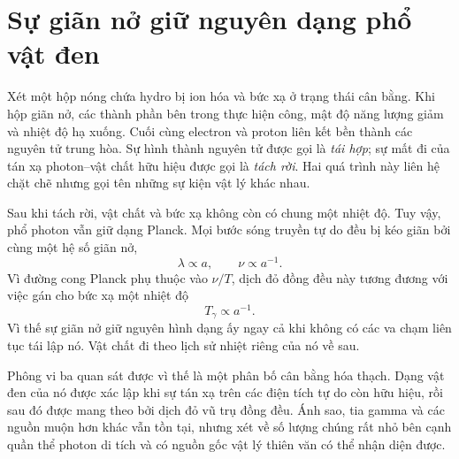 \begin{classroomqa}
\end{classroomqa}

\section{Sự giãn nở giữ nguyên dạng phổ vật đen}

Xét một hộp nóng chứa hydro bị ion hóa và bức xạ ở trạng thái cân bằng. Khi hộp giãn nở, các thành phần bên trong thực hiện công, mật độ năng lượng giảm và nhiệt độ hạ xuống. Cuối cùng electron và proton liên kết bền thành các nguyên tử trung hòa. Sự hình thành nguyên tử được gọi là \emph{tái hợp}; sự mất đi của tán xạ photon--vật chất hữu hiệu được gọi là \emph{tách rời}. Hai quá trình này liên hệ chặt chẽ nhưng gọi tên những sự kiện vật lý khác nhau.

Sau khi tách rời, vật chất và bức xạ không còn có chung một nhiệt độ. Tuy vậy, phổ photon vẫn giữ dạng Planck. Mọi bước sóng truyền tự do đều bị kéo giãn bởi cùng một hệ số giãn nở,
\begin{equation}
\lambda\propto a,
\qquad
\nu\propto a^{-1}.
\end{equation}
Vì đường cong Planck phụ thuộc vào \(\nu/T\), dịch đỏ đồng đều này tương đương với việc gán cho bức xạ một nhiệt độ
\begin{equation}
\boxed{T_\gamma\propto a^{-1}.}
\label{eq:c07-temperature-scaling}
\end{equation}
Vì thế sự giãn nở giữ nguyên hình dạng ấy ngay cả khi không có các va chạm liên tục tái lập nó. Vật chất đi theo lịch sử nhiệt riêng của nó về sau.

Phông vi ba quan sát được vì thế là một phân bố cân bằng hóa thạch. Dạng vật đen của nó được xác lập khi sự tán xạ trên các điện tích tự do còn hữu hiệu, rồi sau đó được mang theo bởi dịch đỏ vũ trụ đồng đều. Ánh sao, tia gamma và các nguồn muộn hơn khác vẫn tồn tại, nhưng xét về số lượng chúng rất nhỏ bên cạnh quần thể photon di tích và có nguồn gốc vật lý thiên văn có thể nhận diện được.

